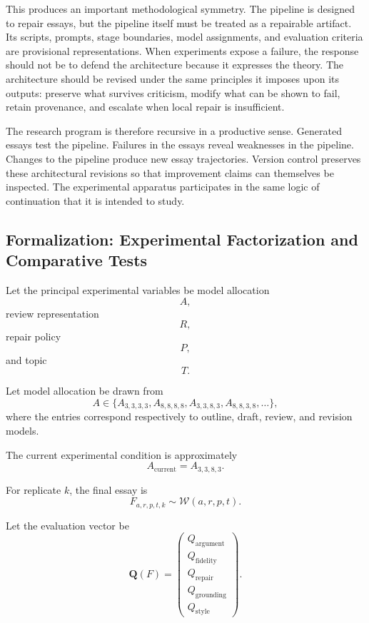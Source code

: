 \documentclass[11pt]{article}
\begin{document}
This produces an important methodological symmetry. The pipeline is designed to repair essays, but the pipeline itself must be treated as a repairable artifact. Its scripts, prompts, stage boundaries, model assignments, and evaluation criteria are provisional representations. When experiments expose a failure, the response should not be to defend the architecture because it expresses the theory. The architecture should be revised under the same principles it imposes upon its outputs: preserve what survives criticism, modify what can be shown to fail, retain provenance, and escalate when local repair is insufficient.

The research program is therefore recursive in a productive sense. Generated essays test the pipeline. Failures in the essays reveal weaknesses in the pipeline. Changes to the pipeline produce new essay trajectories. Version control preserves these architectural revisions so that improvement claims can themselves be inspected. The experimental apparatus participates in the same logic of continuation that it is intended to study.

\subsection{Formalization: Experimental Factorization and Comparative Tests}

Let the principal experimental variables be model allocation
\[
    A,
\]
review representation
\[
    R,
\]
repair policy
\[
    P,
\]
and topic
\[
    T.
\]

Let model allocation be drawn from
\[
    A
    \in
    \{
        A_{3,3,3,3},
        A_{8,8,8,8},
        A_{3,3,8,3},
        A_{8,8,3,8},
        \ldots
    \},
\]
where the entries correspond respectively to outline, draft, review, and revision models.

The current experimental condition is approximately
\[
    A_{\mathrm{current}}
    =
    A_{3,3,8,3}.
\]

For replicate \(k\), the final essay is
\[
    F_{a,r,p,t,k}
    \sim
    \mathcal{W}(a,r,p,t).
\]

Let the evaluation vector be
\[
    \mathbf{Q}(F)
    =
    \begin{pmatrix}
        Q_{\mathrm{argument}}\\
        Q_{\mathrm{fidelity}}\\
        Q_{\mathrm{repair}}\\
        Q_{\mathrm{grounding}}\\
        Q_{\mathrm{style}}
    \end{pmatrix}.
\]
\end{document}
